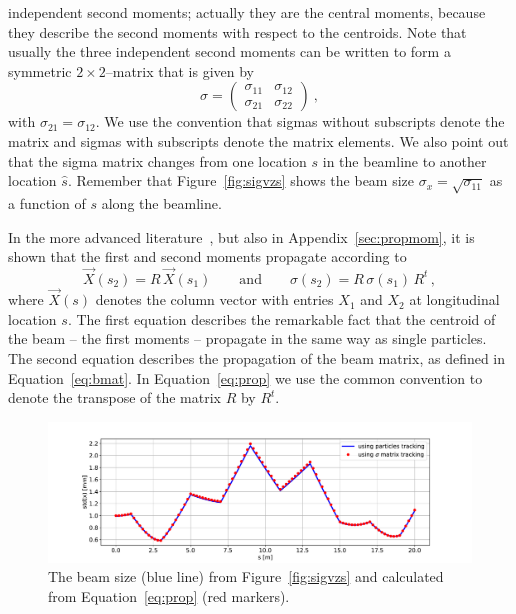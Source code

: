 \documentclass{article}
\begin{document}
independent second moments; actually they are the central moments, because they 
describe the second moments with respect to the centroids. Note that usually the
three independent second moments can be written to form a symmetric $2\times 2$--matrix
that is given by
\begin{equation}\label{eq:bmat}
\sigma=
\left(\begin{array}{cc} \sigma_{11} & \sigma_{12} \\ \sigma_{21}& \sigma_{22}\end{array}\right)\ ,
\end{equation}
with $\sigma_{21}=\sigma_{12}.$ We use the convention that sigmas without 
subscripts denote the matrix and sigmas with subscripts denote the matrix elements. 
We also point out that the sigma matrix changes from one location $s$ in the beamline 
to another location $\hat s.$ Remember that Figure~\ref{fig:sigvzs} shows the beam size
$\sigma_x=\sqrt{\sigma_{11}}$ as a function of $s$ along the beamline.
\par
In the more advanced literature~\cite{VZAPB,WOLSKI}, but also in Appendix~\ref{sec:propmom}, 
it is shown that the first and second moments propagate according to 
\begin{equation}\label{eq:prop}
\vec X(s_2) =  R\, \vec X(s_1)
\qquad\mathrm{and}\qquad
\sigma(s_2) = R\, \sigma(s_1)\, R^t\, ,
\end{equation}
where $\vec X(s)$ denotes the column vector with entries $X_1$ and $X_2$ at longitudinal
location $s.$ The first equation describes the remarkable fact that the centroid of
the beam -- the first moments -- propagate in the same way as single particles. The
second equation describes the propagation of the beam matrix, as defined in 
Equation~\ref{eq:bmat}. In Equation~\ref{eq:prop} we use the common convention to
denote the transpose of the matrix $R$ by $R^t.$
\par
\begin{figure}[tb]
\begin{center}
\includegraphics[width=\textwidth]{_img_primer/exercise_15.pdf}
\end{center}
\caption{\label{fig:sig2}The beam size (blue line) from Figure~\ref{fig:sigvzs} and calculated
  from Equation~\ref{eq:prop} (red markers).}
\end{figure}
\end{document}
